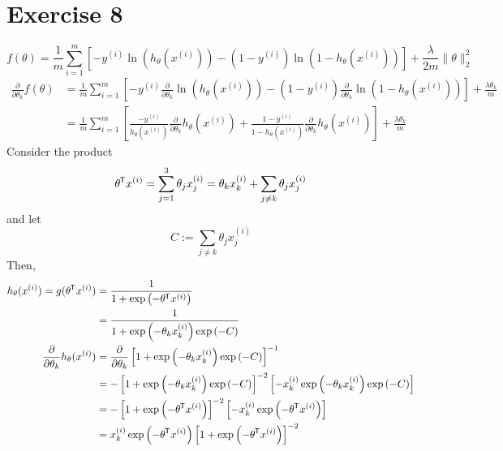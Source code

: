 \documentclass[letterpaper]{amsart}
\newcommand*{\tran}{^{\mkern-1.5mu\mathsf{T}}}
\begin{document}
{\section*{Exercise 8}
\begin{equation*}
  f(\theta)
  =
  \frac{1}{m}
  \sum_{i=1}^m
  \left[
    -y^{(i)}
    \ln\left(h_\theta(x^{(i)})\right)
    -(1 - y^{(i)})
    \ln\left(1-h_\theta(x^{(i)})\right)
  \right]
  + \frac{\lambda}{2m}
  \|\theta\|_2^2
\end{equation*}
\begin{align*}
  \frac{\partial}{\partial\theta_k}
  f(\theta)
  &=
  \frac{1}{m}
  \sum_{i=1}^m
    \left[
    -y^{(i)}
  \frac{\partial}{\partial\theta_k}
    \ln\left(h_\theta(x^{(i)})\right)
  -
    (1 - y^{(i)})
  \frac{\partial}{\partial\theta_k}
    \ln\left(1 - h_\theta(x^{(i)})\right)
  \right]
  + \frac{\lambda\theta_k}{m}
  \\
  &=
  \frac{1}{m}
  \sum_{i=1}^m
    \left[
    \frac
    {-y^{(i)}}
    {h_\theta(x^{(i)})}
  \frac{\partial}{\partial\theta_k}
    h_\theta(x^{(i)})
  +
    \frac
    {1 - y^{(i)}}
    {1 - h_\theta\left(x^{(i)}\right)}
  \frac{\partial}{\partial\theta_k}
    h_\theta(x^{(i)})
  \right]
  + \frac{\lambda\theta_k}{m}
\end{align*}
Consider the product
\begin{equation*}
\theta\tran x^{(i)}
= \sum_{j=1}^3\theta_jx_j^{(i)}
= \theta_kx_k^{(i)}
+ \sum_{j\neq k}\theta_jx_j^{(i)}
\end{equation*}
and let
\begin{equation*}
C:=\sum_{j\neq k}\theta_jx_j^{(i)}
\end{equation*}
Then,
\begin{align*}
  h_\theta(x^{(i)})
  =g(\theta\tran x^{(i)})
  &= \frac{1}{1 + \exp\left(-\theta \tran x^{(i)}\right)}
    \\
  &= \frac{1}
    {1 + \exp\left(-\theta_kx_k^{(i)}\right)
    \exp\left(-C\right)}
    \\
  \frac{\partial}{\partial\theta_k}
  h_\theta(x^{(i)})
  &=
  \frac{\partial}{\partial\theta_k}
  \left[
    1 + \exp\left(-\theta_kx_k^{(i)}\right)
    \exp\left(-C\right)
  \right]^{-1}
  \\
  &=
  -\left[
    1 + \exp\left(-\theta_kx_k^{(i)}\right)
    \exp \left(-C\right)
  \right]^{-2}
  \left[
    -x_k^{(i)}
    \exp\left(-\theta_kx_k^{(i)}\right)
    \exp\left(-C\right)
  \right]
    \\
  &=
  -\left[
    1 + \exp\left(-\theta\tran x^{(i)}\right)
  \right]^{-2}
  \left[
    -x_k^{(i)}
    \exp\left(-\theta\tran x^{(i)}\right)
  \right]
    \\
  &=
    x_k^{(i)}
    \exp\left(-\theta\tran x^{(i)}\right)
  \left[
    1 + \exp\left(-\theta\tran x^{(i)}\right)
  \right]^{-2}


\end{align*}}
\end{document}
